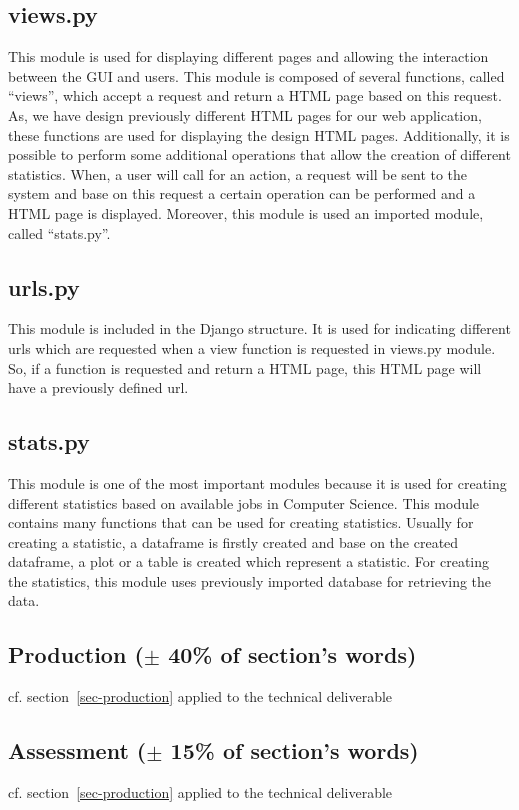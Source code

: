 \documentclass[conference,compsoc]{IEEEtran}
\begin{document}
\subsection{views.py}
This module is used for displaying different pages and allowing the interaction between the GUI and users. This module is composed of several functions, called “views”, which accept a request and return a HTML page based on this request. As, we have design previously different HTML pages for our web application, these functions are used for displaying the design HTML pages. Additionally, it is possible to perform some additional operations that allow the creation of different statistics. When, a user will call for an action, a request will be sent to the system and base on this request a certain operation can be performed and a HTML page is displayed. Moreover, this module is used an imported module, called “stats.py”. 

\subsection{urls.py}
This module is included in the Django structure. It is used for indicating different urls which are requested when a view function is requested in views.py module. So, if a function is requested and return a HTML page, this HTML page will have a previously defined url. 

\subsection{stats.py}
This module is one of the most important modules because it is used for creating different statistics based on available jobs in Computer Science. This module contains many functions that can be used for creating statistics. Usually for creating a statistic, a dataframe is firstly created and base on the created dataframe, a plot or a table is created which represent a statistic. For creating the statistics, this module uses previously imported database for retrieving the data.  

\subsection{Production ($\pm$ 40\% of section's words)}
cf. section~\ref{sec-production} applied to the technical deliverable
\subsection{Assessment ($\pm$ 15\% of section's words)}
cf. section~\ref{sec-production} applied to the technical deliverable
\end{document}

